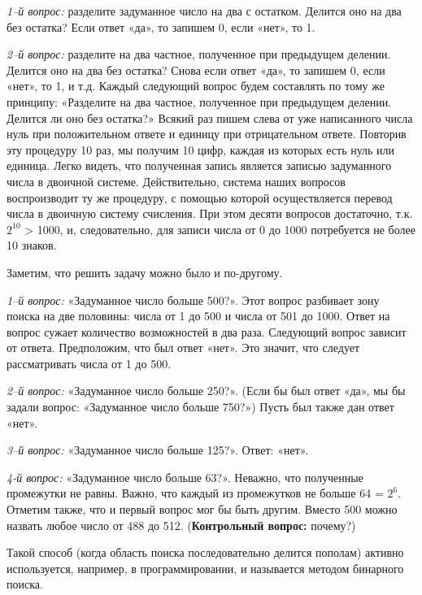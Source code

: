 \begin{prf}
    \textit{1--й вопрос:} разделите задуманное число на два с остатком. Делится оно на два без остатка? Если ответ «да», то запишем 0, если «нет», то 1.
    \par \textit{2--й вопрос:} разделите на два частное, полученное при предыдущем делении. Делится оно на два без остатка? Снова если ответ «да», то запишем 0, если «нет», то 1, и т.д. Каждый следующий вопрос будем составлять по тому же принципу: «Разделите на два частное, полученное при предыдущем делении. Делится ли оно без остатка?» Всякий раз пишем слева от уже написанного числа нуль при положительном ответе и единицу при отрицательном ответе. Повторив эту процедуру 10 раз, мы получим 10 цифр, каждая из которых есть нуль или единица. Легко видеть, что полученная запись является записью задуманного числа в двоичной системе. Действительно, система наших вопросов воспроизводит ту же процедуру, с помощью которой осуществляется перевод числа в двоичную систему счисления. При этом десяти вопросов достаточно, т.к. $2^{10}$ > 1000, и, следовательно, для записи числа от 0 до 1000 потребуется не более 10 знаков.

    Заметим, что решить задачу можно было и по-другому.
    \par
    \textit{1--й вопрос:} «Задуманное число больше 500?». Этот вопрос разбивает зону поиска на две половины: числа от 1 до 500 и числа от 501 до 1000. Ответ на вопрос сужает количество возможностей в два раза. Следующий вопрос зависит от ответа. Предположим, что был ответ «нет». Это значит, что следует рассматривать числа от 1 до 500. 
    \par \textit{2--й вопрос:} «Задуманное число больше 250?». (Если бы был ответ «да», мы бы задали вопрос: «Задуманное число больше 750?») Пусть был также дан ответ «нет». 
    \par \textit{3--й вопрос:} «Задуманное число больше 125?». Ответ: «нет». 
    \par \textit{4-й вопрос:} «Задуманное число больше 63?». Неважно, что полученные промежутки не равны. Важно, что каждый из промежутков не больше 64 = $2^6$. Отметим также, что и первый вопрос мог бы быть другим. Вместо 500 можно назвать любое число от 488 до 512. (\textbf{Контрольный вопрос:} почему?)
\end{prf}

\noindent Такой способ (когда область поиска последовательно делится пополам) активно используется, например, в программировании, и называется методом бинарного поиска.

